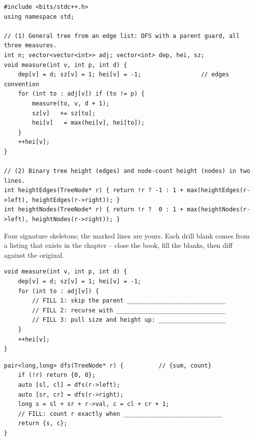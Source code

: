 \begin{lstlisting}[caption={Chapter 1 code kit: the two shapes you reuse everywhere}, label={lst:c01-kit}]
#include <bits/stdc++.h>
using namespace std;

// (1) General tree from an edge list: DFS with a parent guard, all three measures.
int n; vector<vector<int>> adj; vector<int> dep, hei, sz;
void measure(int v, int p, int d) {
    dep[v] = d; sz[v] = 1; hei[v] = -1;                 // edges convention
    for (int to : adj[v]) if (to != p) {
        measure(to, v, d + 1);
        sz[v]   += sz[to];
        hei[v]   = max(hei[v], hei[to]);
    }
    ++hei[v];
}

// (2) Binary tree height (edges) and node-count height (nodes) in two lines.
int heightEdges(TreeNode* r) { return !r ? -1 : 1 + max(heightEdges(r->left), heightEdges(r->right)); }
int heightNodes(TreeNode* r) { return !r ?  0 : 1 + max(heightNodes(r->left), heightNodes(r->right)); }
\end{lstlisting}


Four signature skeletons; the marked lines are yours. Each drill blank comes from a
listing that exists in the chapter -- close the book, fill the blanks, then diff against
the original.

\begin{lstlisting}[caption={Drill 1 -- parent-guard DFS (from \coderef{c01-measure})}]
void measure(int v, int p, int d) {
    dep[v] = d; sz[v] = 1; hei[v] = -1;
    for (int to : adj[v]) {
        // FILL 1: skip the parent ____________________________
        // FILL 2: recurse with _______________________________
        // FILL 3: pull size and height up: ___________________
    }
    ++hei[v];
}
\end{lstlisting}

\begin{lstlisting}[caption={Drill 2 -- bottom-up pair return (from \coderef{c01-count-avg})}]
pair<long,long> dfs(TreeNode* r) {          // {sum, count}
    if (!r) return {0, 0};
    auto [sl, cl] = dfs(r->left);
    auto [sr, cr] = dfs(r->right);
    long s = sl + sr + r->val, c = cl + cr + 1;
    // FILL: count r exactly when ____________________________
    return {s, c};
}
\end{lstlisting}

